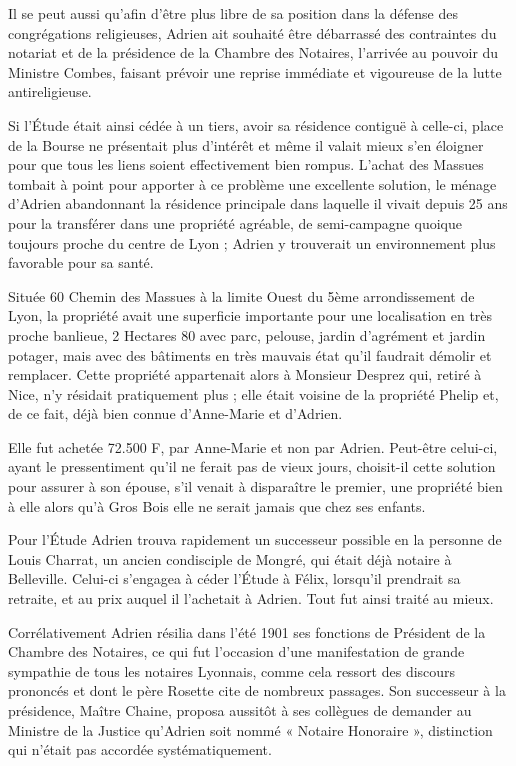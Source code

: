 \documentclass[11pt,a4paper]{report}
\begin{document}
Il se peut aussi qu'afin d'être plus libre de sa position dans la défense des congrégations religieuses, Adrien ait souhaité être débarrassé des contraintes du notariat et de la présidence de la Chambre des Notaires, l'arrivée au pouvoir du Ministre Combes, faisant prévoir une reprise immédiate et vigoureuse de la lutte antireligieuse.


Si l'Étude était ainsi cédée à un tiers, avoir sa résidence contiguë à celle-ci, place de la Bourse ne présentait plus d'intérêt et même il valait mieux s'en éloigner pour que tous les liens soient effectivement bien rompus. L'achat des Massues tombait à point pour apporter à ce problème une excellente solution, le ménage d'Adrien abandonnant la résidence principale dans laquelle il vivait depuis 25 ans pour la transférer dans une propriété agréable, de semi-campagne quoique toujours proche du centre de Lyon ; Adrien y trouverait un environnement plus favorable pour sa santé.

Située 60 Chemin des Massues à la limite Ouest du 5ème arrondissement de Lyon, la propriété avait une superficie importante pour une localisation en très proche banlieue, 2 Hectares 80 avec parc, pelouse, jardin d'agrément et jardin potager, mais avec des bâtiments en très mauvais état qu'il faudrait démolir et remplacer. Cette propriété appartenait alors à Monsieur Desprez qui, retiré à Nice, n'y résidait pratiquement plus ; elle était voisine de la propriété Phelip et, de ce fait, déjà bien connue d'Anne-Marie et d'Adrien.

Elle fut achetée 72.500 F, par Anne-Marie et non par Adrien. Peut-être celui-ci, ayant le pressentiment qu'il ne ferait pas de vieux jours, choisit-il cette solution pour assurer à son épouse, s'il venait à disparaître le premier, une propriété bien à elle alors qu'à Gros Bois elle ne serait jamais que chez ses enfants.

Pour l'Étude Adrien trouva rapidement un successeur possible en la personne de Louis Charrat, un ancien condisciple de Mongré, qui était déjà notaire à Belleville. Celui-ci s'engagea à céder l'Étude à Félix, lorsqu'il prendrait sa retraite, et au prix auquel il l'achetait à Adrien. Tout fut ainsi traité au mieux.

Corrélativement Adrien résilia dans l'été 1901 ses fonctions de Président de la Chambre des Notaires, ce qui fut l'occasion d'une manifestation de grande sympathie de tous les notaires Lyonnais, comme cela ressort des discours prononcés et dont le père Rosette cite de nombreux passages. Son successeur à la présidence, Maître Chaine, proposa aussitôt à ses collègues de demander au Ministre de la Justice qu'Adrien soit nommé « Notaire Honoraire », distinction qui n'était pas accordée systématiquement.
\end{document}
